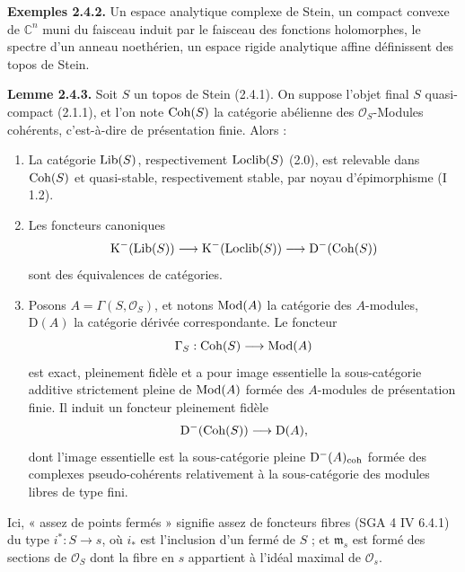 \documentclass[11pt]{article}
\begin{document}
\textbf{Exemples 2.4.2.} Un espace analytique complexe de Stein, un compact convexe de $\mathbb C^n$ muni du faisceau induit par le faisceau des fonctions holomorphes, le spectre d'un anneau noethérien, un espace rigide analytique affine définissent des topos de Stein.

\textbf{Lemme 2.4.3.} Soit $S$ un topos de Stein (2.4.1). On suppose l'objet final $S$ quasi-compact (2.1.1), et l'on note $\operatorname{Coh}(S)$ la catégorie abélienne des $\mathcal O_S$-Modules cohérents, c'est-à-dire de présentation finie. Alors :
\begin{enumerate}[label=\alph*)]
\item La catégorie $\operatorname{Lib}(S)$, respectivement $\operatorname{Loclib}(S)$ (2.0), est relevable dans $\operatorname{Coh}(S)$ et quasi-stable, respectivement stable, par noyau d'épimorphisme (I 1.2).
\item Les foncteurs canoniques
\[
\mathrm K^{-}(\operatorname{Lib}(S))\longrightarrow\mathrm K^{-}(\operatorname{Loclib}(S))\longrightarrow\mathrm D^{-}(\operatorname{Coh}(S))
\]
sont des équivalences de catégories.
\item Posons $A=\Gamma(S,\mathcal O_S)$, et notons $\operatorname{Mod}(A)$ la catégorie des $A$-modules, $\mathrm D(A)$ la catégorie dérivée correspondante. Le foncteur
\[
\Gamma_S:\operatorname{Coh}(S)\longrightarrow\operatorname{Mod}(A)
\]
est exact, pleinement fidèle et a pour image essentielle la sous-catégorie additive strictement pleine de $\operatorname{Mod}(A)$ formée des $A$-modules de présentation finie. Il induit un foncteur pleinement fidèle
\[
\mathrm D^{-}(\operatorname{Coh}(S))\longrightarrow\mathrm D(A),
\]
dont l'image essentielle est la sous-catégorie pleine $\mathrm D^{-}(A)_{\operatorname{coh}}$ formée des complexes pseudo-cohérents relativement à la sous-catégorie des modules libres de type fini.
\end{enumerate}
Ici, « assez de points fermés » signifie assez de foncteurs fibres (SGA 4 IV 6.4.1) du type $i^*:S\to s$, où $i_*$ est l'inclusion d'un fermé de $S$ ; et $\mathfrak m_s$ est formé des sections de $\mathcal O_S$ dont la fibre en $s$ appartient à l'idéal maximal de $\mathcal O_s$.
\end{document}
